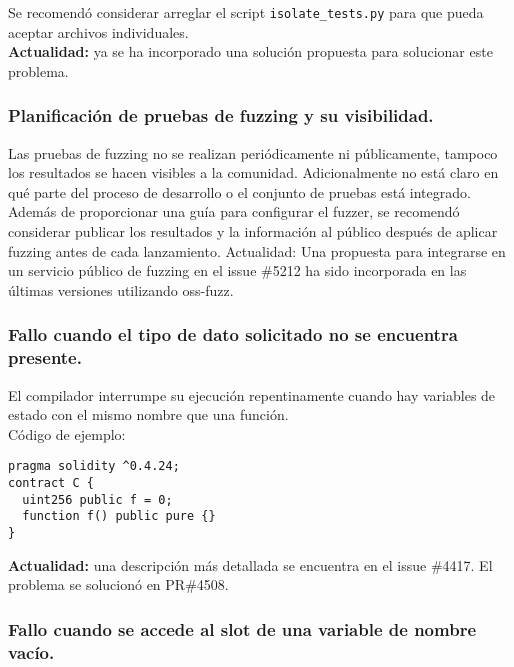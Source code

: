 Se recomendó considerar arreglar el script \verb|isolate_tests.py| para que pueda aceptar archivos individuales.\\

\textbf{Actualidad:} ya se ha incorporado una solución propuesta para solucionar este problema.

\subsubsection{Planificación de pruebas de fuzzing y su visibilidad.}

Las pruebas de fuzzing no se realizan periódicamente ni públicamente, tampoco los resultados se hacen visibles a la comunidad. Adicionalmente no está claro en qué parte del proceso de desarrollo o el conjunto de pruebas está integrado.\\

Además de proporcionar una guía para configurar el fuzzer, se recomendó considerar publicar los resultados y la información al público después de aplicar fuzzing antes de cada lanzamiento.
Actualidad: Una propuesta para integrarse en un servicio público de fuzzing en el issue \#5212 ha sido incorporada en las últimas versiones utilizando oss-fuzz.\\

\subsubsection{Fallo cuando el tipo de dato solicitado no se encuentra presente.}

El compilador interrumpe su ejecución repentinamente cuando hay variables de estado con el mismo nombre que una función.\\

Código de ejemplo:
\begin{lstlisting}[language=Solidity]
pragma solidity ^0.4.24;
contract C {
  uint256 public f = 0;
  function f() public pure {}
}
\end{lstlisting}

\textbf{Actualidad:} una descripción más detallada se encuentra en el issue \#4417. El problema se solucionó en PR\#4508.\\

\subsubsection{Fallo cuando se accede al slot de una variable de nombre vacío.}

